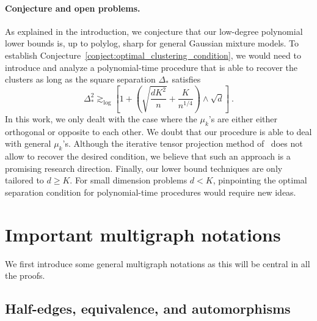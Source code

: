 \documentclass{article}
\begin{document}
\paragraph{Conjecture and open problems.} As explained in the introduction, we conjecture that our low-degree polynomial lower bounds is, up to polylog, sharp for general Gaussian mixture models. To establish Conjecture~\ref{conject:optimal_clustering_condition}, we would need to introduce and analyze a polynomial-time  procedure that is able to recover the clusters as long as the square separation $\Delta_*$ satisfies
\[
\Delta_*^2 \gtrsim_{\log}  \left[1 + \left( \sqrt{\frac{dK^2}{n}}+  \frac{K}{n^{1/4}} \right)  \wedge \sqrt{d} \right]\ .
\]
In this work, we only dealt with the case where the $\mu_k$'s are either either orthogonal or opposite to each other.  We doubt that our procedure is able to deal with general $\mu_k$'s. 
Although the iterative tensor projection method of~\cite{LiuLi2022} does not allow to recover the desired condition, we believe that such an approach is a promising research direction.  Finally, our lower bound techniques are only tailored to $d\geq K$. For small dimension problems $d< K$, pinpointing the optimal separation condition for polynomial-time procedures would require  new ideas. 












\section{Important multigraph notations}\label{sec:multigraph}


We first introduce some general multigraph notations as this will be central in all the proofs.












\subsection{Half-edges, equivalence, and automorphisms}
\end{document}
